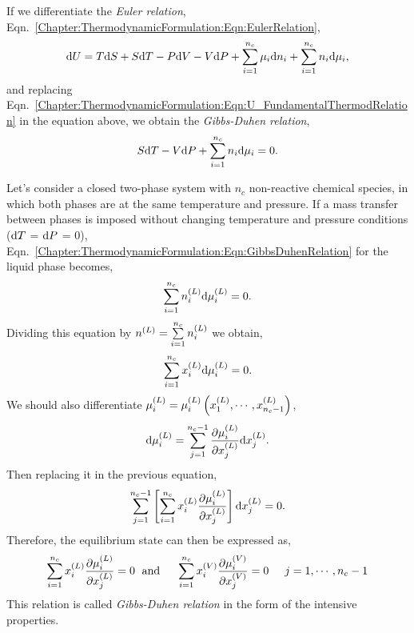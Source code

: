 If we differentiate the {\it Euler relation}, Eqn.~\ref{Chapter:ThermodynamicFormulation:Eqn:EulerRelation},
\begin{displaymath}
  \d U = T\d S + S\d T - P\d V - V\d P + \summation_{i=1}^{n_{c}}\mu_{i}\d n_{i} + \summation_{i=1}^{n_{c}} n_{i}\d\mu_{i},
\end{displaymath}
and replacing Eqn.~\ref{Chapter:ThermodynamicFormulation:Eqn:U_FundamentalThermodRelation} in the equation above, we obtain the {\it Gibbs-Duhen relation},
\begin{equation}
   S\d T -V\d P + \summation_{i=1}^{n_{c}} n_{i}\d\mu_{i} = 0.\label{Chapter:ThermodynamicFormulation:Eqn:GibbsDuhenRelation}
\end{equation}

\bigskip

Let's consider a closed two-phase system with $n_{c}$ non-reactive chemical species, in which both phases are at the same temperature and pressure. If a mass transfer between phases is imposed without changing temperature and pressure conditions (\ie $\d T$ = $\d P$ = 0), Eqn.~\ref{Chapter:ThermodynamicFormulation:Eqn:GibbsDuhenRelation} for the liquid phase becomes,
\begin{displaymath}
   \summation_{i=1}^{n_{c}} \mfr[n]{i}{L}\d\mfr[\mu]{i}{L} = 0.
\end{displaymath}
Dividing this equation by $\mfr[n]{}{L}=\summation_{i=1}^{n_{c}}\mfr[n]{i}{L}$ we obtain,
\begin{displaymath}
   \summation_{i=1}^{n_{c}} \mfr[x]{i}{L}\d\mfr[\mu]{i}{L} = 0.
\end{displaymath}
We should also differentiate $\mfr[\mu]{i}{L} = \mfr[\mu]{i}{L}\left(\mfr[x]{1}{L}, \cdots, \mfr[x]{n_{c}-1}{L}\right)$,
\begin{displaymath}
   \d\mfr[\mu]{i}{L} = \summation_{j=1}^{n_{c}-1} \frc{\partial\mfr[\mu]{i}{L}}{\partial\mfr[x]{j}{L}}\d\mfr[x]{j}{L}.
\end{displaymath}
Then replacing it in the previous equation,
\begin{displaymath}
   \summation_{j=1}^{n_{c}-1}\left[\summation_{i=1}^{n_{c}} \mfr[x]{i}{L}\frc{\partial\mfr[\mu]{i}{L}}{\partial\mfr[x]{j}{L}}\right]\d\mfr[x]{j}{L} = 0.
\end{displaymath}
 Therefore, the equilibrium state can then be expressed as,
\begin{equation}
   \summation_{i=1}^{n_{c}} \mfr[x]{i}{L}\frc{\partial\mfr[\mu]{i}{L}}{\partial\mfr[x]{j}{L}} = 0 \hspace{.1cm}\text{ and }\hspace{.4cm} \summation_{i=1}^{n_{c}} \mfr[x]{i}{V}\frc{\partial\mfr[\mu]{i}{V}}{\partial\mfr[x]{j}{V}} = 0 \hspace{.5cm} j=1, \cdots, n_{c}-1\label{Chapter:ThermodynamicFormulation:Eqn:GibbsDuhenRelation_2}
\end{equation}
This relation is called {\it Gibbs-Duhen relation} in the form of the intensive properties.


